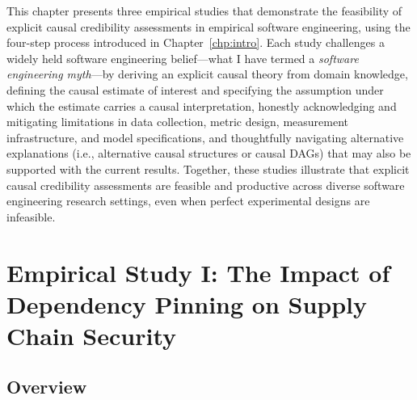 This chapter presents three empirical studies that demonstrate the feasibility of explicit causal credibility assessments in empirical software engineering, using the four-step process introduced in Chapter~\ref{chp:intro}.
Each study challenges a widely held software engineering belief---what I have termed a \emph{software engineering myth}---by deriving an explicit causal theory from domain knowledge, defining the causal estimate of interest and specifying the assumption under which the estimate carries a causal interpretation, honestly acknowledging and mitigating limitations in data collection, metric design, measurement infrastructure, and model specifications, and thoughtfully navigating alternative explanations (i.e., alternative causal structures or causal DAGs) that may also be supported with the current results.
Together, these studies illustrate that explicit causal credibility assessments are feasible and productive across diverse software engineering research settings, even when perfect experimental designs are infeasible.

\section{Empirical Study I: The Impact of Dependency Pinning on Supply Chain Security}
\label{sec:finished-pinning}
\label{chp:pinning}

\subsection{Overview}

